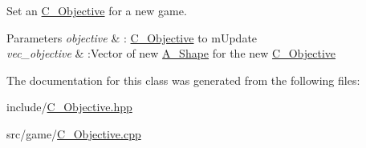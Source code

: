 Set an \hyperlink{classC__Objective}{C\+\_\+\+Objective} for a new game. 


\begin{DoxyParams}{Parameters}
{\em objective} & \+: \hyperlink{classC__Objective}{C\+\_\+\+Objective} to m\+Update \\
\hline
{\em vec\+\_\+objective} & \+:Vector of new \hyperlink{classA__Shape}{A\+\_\+\+Shape} for the new \hyperlink{classC__Objective}{C\+\_\+\+Objective} \\
\hline
\end{DoxyParams}


The documentation for this class was generated from the following files\+:\begin{DoxyCompactItemize}
\item 
include/\hyperlink{C__Objective_8hpp}{C\+\_\+\+Objective.\+hpp}\item 
src/game/\hyperlink{C__Objective_8cpp}{C\+\_\+\+Objective.\+cpp}\end{DoxyCompactItemize}
